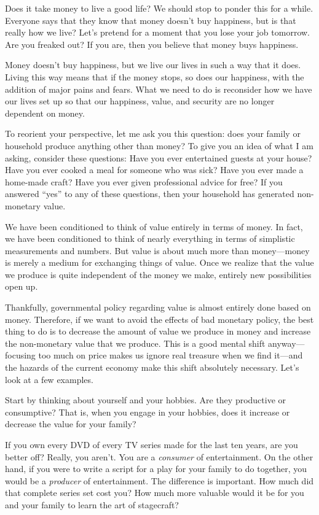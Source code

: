 Does it take money to live a good life?  We should stop to ponder this
for a while. Everyone says that they know that money doesn’t buy
happiness, but is that really how we live? Let’s pretend for a moment
that you lose your job tomorrow. Are you freaked out?  If you are, then
you believe that money buys happiness. 

Money doesn’t buy happiness, but we live our lives in such a way that
it does. Living this way means that if the money stops,
so does our happiness, with the addition of major pains and fears. 
What we need to do is reconsider how we have our lives set up so
that our happiness, value, and security are no longer dependent on money.

To reorient your perspective, let me ask you this question: does your
family or household produce anything other than money?  To give you an
idea of what I am asking, consider these questions: Have you ever
entertained guests at your house?  Have you ever cooked a meal for
someone who was sick?  Have you ever made a home-made craft?  Have you
ever given professional advice for free?  If you answered ``yes'' to any
of these questions, then your household has generated non-monetary
value. 

We have been conditioned to think of value entirely in terms of money.
In fact, we have been conditioned to think of nearly everything in
terms of simplistic measurements and numbers. But value is about much
more than money---money is merely a medium for exchanging things of
value. Once we realize that the value we produce is quite independent
of the money we make, entirely new possibilities open up.

Thankfully, governmental policy regarding value is almost entirely done
based on money. Therefore, if we want to avoid the effects of bad
monetary policy, the best thing to do is to decrease the amount of
value we produce in money and increase the non-monetary value that we
produce. This is a good mental shift anyway---focusing too much on price
makes us ignore real treasure when we find it---and the hazards of the
current economy make this shift absolutely necessary.
Let’s look at a few examples. 

Start by thinking about yourself and your hobbies. Are they productive
or consumptive?  That is, when you engage in your hobbies, does it
increase or decrease the value for your family? 

If you own every DVD of every TV series made for the last ten years, are
you better off?  Really, you aren’t. You are a \textit{consumer} of
entertainment. On the other hand, if you were to write a script for a
play for your family to do together, you would be a \textit{producer}
of entertainment. The difference is important. How much did that
complete series set cost you?  How much more valuable would it be for
you and your family to learn the art of stagecraft? 

